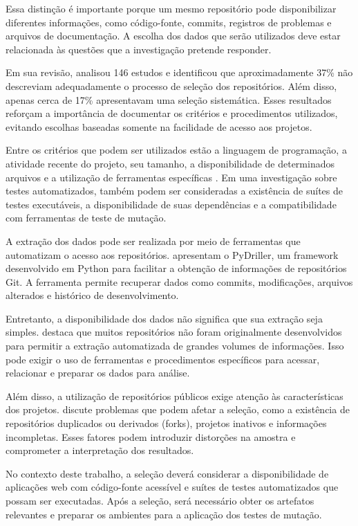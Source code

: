 Essa distinção é importante porque um mesmo repositório pode disponibilizar diferentes informações, como código-fonte, commits, registros de problemas e arquivos de documentação. A escolha dos dados que serão utilizados deve estar relacionada às questões que a investigação pretende responder.

Em sua revisão,  analisou 146 estudos e identificou que aproximadamente 37\% não descreviam adequadamente o processo de seleção dos repositórios. Além disso, apenas cerca de 17\% apresentavam uma seleção sistemática. Esses resultados reforçam a importância de documentar os critérios e procedimentos utilizados, evitando escolhas baseadas somente na facilidade de acesso aos projetos.

Entre os critérios que podem ser utilizados estão a linguagem de programação, a atividade recente do projeto, seu tamanho, a disponibilidade de determinados arquivos e a utilização de ferramentas específicas \cite{vidoni2022}. Em uma investigação sobre testes automatizados, também podem ser consideradas a existência de suítes de testes executáveis, a disponibilidade de suas dependências e a compatibilidade com ferramentas de teste de mutação.

A extração dos dados pode ser realizada por meio de ferramentas que automatizam o acesso aos repositórios.  apresentam o PyDriller, um framework desenvolvido em Python para facilitar a obtenção de informações de repositórios Git. A ferramenta permite recuperar dados como commits, modificações, arquivos alterados e histórico de desenvolvimento.

Entretanto, a disponibilidade dos dados não significa que sua extração seja simples.  destaca que muitos repositórios não foram originalmente desenvolvidos para permitir a extração automatizada de grandes volumes de informações. Isso pode exigir o uso de ferramentas e procedimentos específicos para acessar, relacionar e preparar os dados para análise.

Além disso, a utilização de repositórios públicos exige atenção às características dos projetos.  discute problemas que podem afetar a seleção, como a existência de repositórios duplicados ou derivados (forks), projetos inativos e informações incompletas. Esses fatores podem introduzir distorções na amostra e comprometer a interpretação dos resultados.

No contexto deste trabalho, a seleção deverá considerar a disponibilidade de aplicações web com código-fonte acessível e suítes de testes automatizados que possam ser executadas. Após a seleção, será necessário obter os artefatos relevantes e preparar os ambientes para a aplicação dos testes de mutação.

